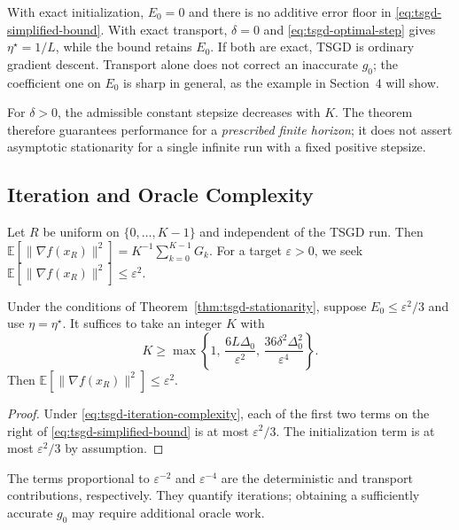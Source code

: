 With exact initialization, $E_0=0$ and there is no additive error floor
in \eqref{eq:tsgd-simplified-bound}. With exact transport, $\delta=0$
and \eqref{eq:tsgd-optimal-step} gives $\eta^\star=1/L$, while the
bound retains $E_0$. If both are exact, TSGD is ordinary gradient
descent. Transport alone does not correct an inaccurate $g_0$; the
coefficient one on $E_0$ is sharp in general, as the example in
Section~4 will show.

For $\delta>0$, the admissible constant stepsize decreases with $K$.
The theorem therefore guarantees performance for a \emph{prescribed
finite horizon}; it does not assert asymptotic stationarity for a
single infinite run with a fixed positive stepsize.

\subsection{Iteration and Oracle Complexity}
\label{subsec:tsgd-complexity}

Let $R$ be uniform on $\{0,\ldots,K-1\}$ and independent of the TSGD
run. Then
$\mathbb{E}[\|\nabla f(x_R)\|^2]
=K^{-1}\sum_{k=0}^{K-1}G_k$. For a target $\varepsilon>0$, we seek
$\mathbb{E}[\|\nabla f(x_R)\|^2]\leq\varepsilon^2$.

\begin{corollary}
\label{cor:tsgd-iteration-complexity}
Under the conditions of Theorem~\ref{thm:tsgd-stationarity}, suppose
$E_0\leq\varepsilon^2/3$ and use $\eta=\eta^\star$. It suffices to take
an integer $K$ with
\begin{equation}
\label{eq:tsgd-iteration-complexity}
\boxed{
K\geq
\max\left\{
1,\,
\frac{6L\Delta_0}{\varepsilon^2},\,
\frac{36\delta^2\Delta_0^2}{\varepsilon^4}
\right\}.}
\end{equation}
Then $\mathbb{E}[\|\nabla f(x_R)\|^2]\leq\varepsilon^2$.
\end{corollary}

\begin{proof}
Under \eqref{eq:tsgd-iteration-complexity}, each of the first two
terms on the right of \eqref{eq:tsgd-simplified-bound} is at most
$\varepsilon^2/3$. The initialization term is at most
$\varepsilon^2/3$ by assumption.
\end{proof}

The terms proportional to $\varepsilon^{-2}$ and
$\varepsilon^{-4}$ are the deterministic and transport contributions,
respectively. They quantify iterations; obtaining a sufficiently
accurate $g_0$ may require additional oracle work.

